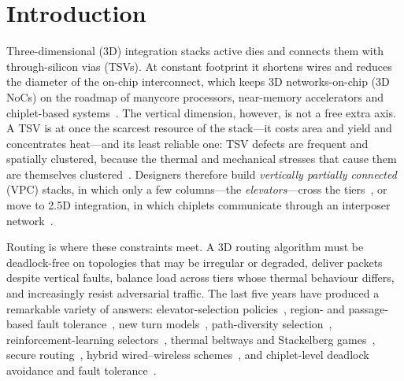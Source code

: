 \section{Introduction}
\label{sec:intro}

Three-dimensional (3D) integration stacks active dies and connects them with through-silicon vias (TSVs). At constant footprint it shortens wires and reduces the diameter of the on-chip interconnect, which keeps 3D networks-on-chip (3D NoCs) on the roadmap of manycore processors, near-memory accelerators and chiplet-based systems~\cite{pavlidis2007topologies,kaur2024mapping}. The vertical dimension, however, is not a free extra axis. A TSV is at once the scarcest resource of the stack---it costs area and yield and concentrates heat---and its least reliable one: TSV defects are frequent and spatially clustered, because the thermal and mechanical stresses that cause them are themselves clustered~\cite{dang2021hotcluster,wang2015clustering}. Designers therefore build \emph{vertically partially connected} (VPC) stacks, in which only a few columns---the \emph{elevators}---cross the tiers~\cite{dubois2013elevator,charif2018firstlast}, or move to 2.5D integration, in which chiplets communicate through an interposer network~\cite{yin2018modular,taheri2022deft}.

Routing is where these constraints meet. A 3D routing algorithm must be deadlock-free on topologies that may be irregular or degraded, deliver packets despite vertical faults, balance load across tiers whose thermal behaviour differs, and increasingly resist adversarial traffic. The last five years have produced a remarkable variety of answers: elevator-selection policies~\cite{taheri2021adele,taheri2023adeleplus,ctwr2025}, region- and passage-based fault tolerance~\cite{jiao2023aftc,kurokawa2025passage}, new turn models~\cite{sharma2023prime}, path-diversity selection~\cite{khodadadi2022ftpdc}, reinforcement-learning selectors~\cite{liu2022ttqr,jiao2023rlara,aslan2026blar}, thermal beltways and Stackelberg games~\cite{dadmand2025ambtar,ning2026star}, secure routing~\cite{dasilva2025securet3d,taheri2024script}, hybrid wired--wireless schemes~\cite{singh2026atlas}, and chiplet-level deadlock avoidance and fault tolerance~\cite{taheri2022deft,taheri2024red,liu2024ilp,zhou2025fcara}.

